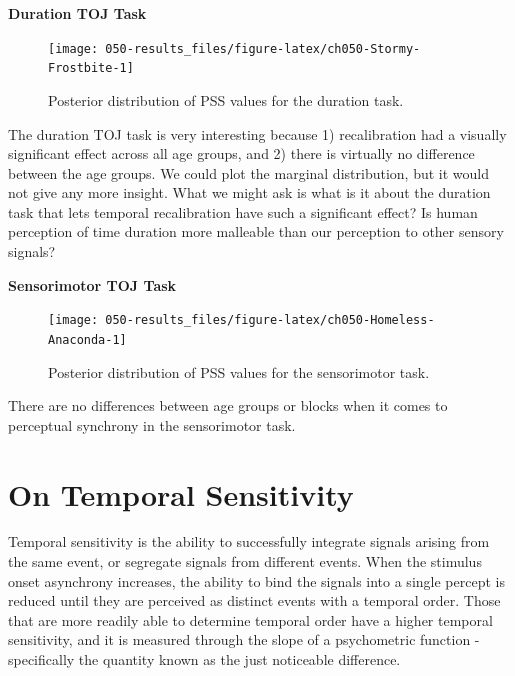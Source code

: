 \documentclass[11pt, oneside, openany]{scrbook}
\begin{document}
\textbf{Duration TOJ Task}

\begin{figure}

{\centering \texttt{[image: 050-results\_files/figure-latex/ch050-Stormy-Frostbite-1]} 

}

\caption{Posterior distribution of PSS values for the duration task.}\label{fig:ch050-Stormy-Frostbite}
\end{figure}

The duration TOJ task is very interesting because 1) recalibration had a visually significant effect across all age groups, and 2) there is virtually no difference between the age groups. We could plot the marginal distribution, but it would not give any more insight. What we might ask is what is it about the duration task that lets temporal recalibration have such a significant effect? Is human perception of time duration more malleable than our perception to other sensory signals?

\textbf{Sensorimotor TOJ Task}

\begin{figure}

{\centering \texttt{[image: 050-results\_files/figure-latex/ch050-Homeless-Anaconda-1]} 

}

\caption{Posterior distribution of PSS values for the sensorimotor task.}\label{fig:ch050-Homeless-Anaconda}
\end{figure}

There are no differences between age groups or blocks when it comes to perceptual synchrony in the sensorimotor task.

\hypertarget{on-temporal-sensitivity}{%
\section{On Temporal Sensitivity}\label{on-temporal-sensitivity}}

Temporal sensitivity is the ability to successfully integrate signals arising from the same event, or segregate signals from different events. When the stimulus onset asynchrony increases, the ability to bind the signals into a single percept is reduced until they are perceived as distinct events with a temporal order. Those that are more readily able to determine temporal order have a higher temporal sensitivity, and it is measured through the slope of a psychometric function - specifically the quantity known as the just noticeable difference.
\end{document}
